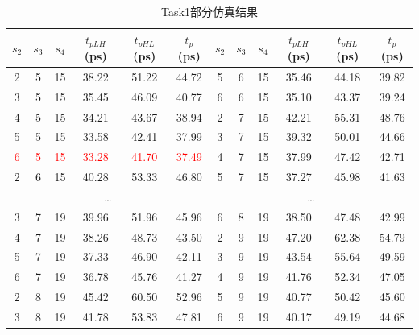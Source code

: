 \documentclass[UTF8,12pt,a4paper]{ctexart}
\begin{document}
\begin{table}[htbp]
    \centering
    \caption{Task1部分仿真结果}
    \label{tab:task1_results}
    \begin{tabular}{cccccc|cccccc}
        \toprule
        $s_2$ & $s_3$ & $s_4$ & $t_{pLH}$(ps) & $t_{pHL}$(ps) & $t_p$(ps) & $s_2$ & $s_3$ & $s_4$ & $t_{pLH}$(ps) & $t_{pHL}$(ps) & $t_p$(ps) \\
        \midrule
        2 & 5 & 15 & 38.22 & 51.22 & 44.72 & 5 & 6 & 15 & 35.46 & 44.18 & 39.82 \\
        3 & 5 & 15 & 35.45 & 46.09 & 40.77 & 6 & 6 & 15 & 35.10 & 43.37 & 39.24 \\
        4 & 5 & 15 & 34.21 & 43.67 & 38.94 & 2 & 7 & 15 & 42.21 & 55.31 & 48.76 \\
        5 & 5 & 15 & 33.58 & 42.41 & 37.99 & 3 & 7 & 15 & 39.32 & 50.01 & 44.66 \\
        \textcolor{red}{6} & \textcolor{red}{5} & \textcolor{red}{15} & \textcolor{red}{33.28} & \textcolor{red}{41.70} & \textcolor{red}{37.49} & 4 & 7 & 15 & 37.99 & 47.42 & 42.71 \\
        2 & 6 & 15 & 40.28 & 53.33 & 46.80 & 5 & 7 & 15 & 37.27 & 45.98 & 41.63 \\
        \midrule
        \multicolumn{6}{c}{\dots} & \multicolumn{6}{c}{\dots} \\
        \midrule
        3 & 7 & 19 & 39.96 & 51.96 & 45.96 & 6 & 8 & 19 & 38.50 & 47.48 & 42.99 \\
        4 & 7 & 19 & 38.26 & 48.73 & 43.50 & 2 & 9 & 19 & 47.20 & 62.38 & 54.79 \\
        5 & 7 & 19 & 37.33 & 46.90 & 42.11 & 3 & 9 & 19 & 43.54 & 55.64 & 49.59 \\
        6 & 7 & 19 & 36.78 & 45.76 & 41.27 & 4 & 9 & 19 & 41.76 & 52.34 & 47.05 \\
        2 & 8 & 19 & 45.42 & 60.50 & 52.96 & 5 & 9 & 19 & 40.77 & 50.42 & 45.60 \\
        3 & 8 & 19 & 41.78 & 53.83 & 47.81 & 6 & 9 & 19 & 40.17 & 49.19 & 44.68 \\
        \bottomrule
    \end{tabular}
\end{table}


\newpage
\end{document}

